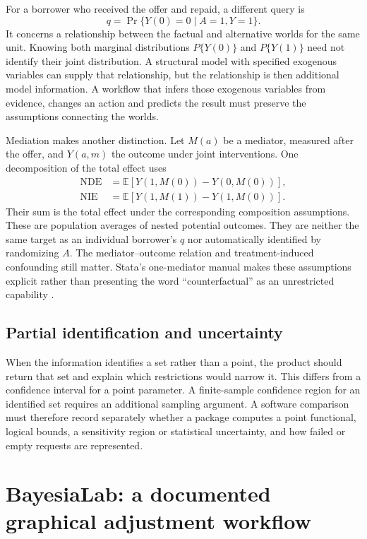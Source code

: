 For a borrower who received the offer and repaid, a different query is
\[
 q=\Pr\{Y(0)=0\mid A=1,Y=1\}.
\]
It concerns a relationship between the factual and alternative worlds for
the same unit. Knowing both marginal distributions $P\{Y(0)\}$ and
$P\{Y(1)\}$ need not identify their joint distribution. A structural model
with specified exogenous variables can supply that relationship, but the
relationship is then additional model information. A workflow that infers
those exogenous variables from evidence, changes an action and predicts the
result must preserve the assumptions connecting the worlds.

Mediation makes another distinction. Let $M(a)$ be a mediator, measured after
the offer, and $Y(a,m)$ the outcome under joint interventions. One decomposition
of the total effect uses
\begin{align*}
 \mathrm{NDE}&=\mathbb E[Y(1,M(0))-Y(0,M(0))],\\
 \mathrm{NIE}&=\mathbb E[Y(1,M(1))-Y(1,M(0))].
\end{align*}
Their sum is the total effect under the corresponding composition assumptions.
These are population averages of nested potential outcomes. They are neither
the same target as an individual borrower's $q$ nor automatically identified
by randomizing $A$. The mediator--outcome relation and treatment-induced
confounding still matter. Stata's one-mediator manual makes these assumptions
explicit rather than presenting the word ``counterfactual'' as an unrestricted
capability \citep{exec13_ci_stata_mediate}.

\subsection{Partial identification and uncertainty}

When the information identifies a set rather than a point, the product should
return that set and explain which restrictions would narrow it. This differs
from a confidence interval for a point parameter. A finite-sample confidence
region for an identified set requires an additional sampling argument. A
software comparison must therefore record separately whether a package computes
a point functional, logical bounds, a sensitivity region or statistical
uncertainty, and how failed or empty requests are represented.

\section{BayesiaLab: a documented graphical adjustment workflow}

